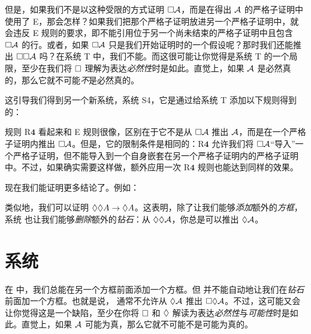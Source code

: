 但是，如果我们不是以这种受限的方式证明 $\Box\mathcal{A}$，而是在得出 $\mathcal{A}$ 的严格子证明中使用了 \ebox E，那会怎样？如果我们把那个严格子证明放进另一个严格子证明中，就会违反 \ebox E 规则的要求，即不能引用位于另一个尚未结束的严格子证明中且包含 $\Box\mathcal{A}$ 的行。或者，如果 $\Box\mathcal{A}$ 只是我们开始证明时的一个假设呢？那时我们还能推出 $\Box\Box\mathcal{A}$ 吗？在系统 T 中，我们不能。而这很可能让你觉得是系统 T 的一个局限，至少在我们将 $\Box$ 理解为表达\emph{必然性}时是如此。直觉上，如果 $\mathcal{A}$ 是必然真的，那么它就不可能\emph{不}是必然真的。

这引导我们得到另一个新系统，系统 S4，它是通过给系统 T 添加以下规则得到的：

规则 R$\mathbf{4}$ 看起来和 {\ebox}E 规则很像，区别在于它不是从 $\Box\mathcal{A}$ 推出 $\mathcal{A}$，而是在一个严格子证明内推出 $\Box\mathcal{A}$。但是，它的限制条件是相同的：R$\mathbf{4}$ 允许我们将 $\Box \mathcal{A}$“导入”一个严格子证明，但不能导入到一个自身嵌套在另一个严格子证明内的严格子证明中。不过，如果确实需要这样做，额外应用一次 R$\mathbf{4}$ 规则也能达到同样的效果。

现在我们能证明更多结论了。例如：

\begin{fitchproof}
	\open
	\AS
	\open
	\AS
	\close
	\close
\end{fitchproof}

类似地，我们可以证明 $\Diamond\Diamond A \rightarrow \Diamond A$。这表明，除了让我们能够\emph{添加}额外的\emph{方框}，系统 \mlSfour{} 也让我们能够\emph{删除}额外的\emph{钻石}：从 $\Diamond\Diamond \mathcal{A}$，你总是可以推出 $\Diamond\mathcal{A}$。

\section{系统 \mlSfive}
\label{S5}

在 \mlSfour{} 中，我们总能在另一个方框前面添加一个方框。但 \mlSfour{} 并不能自动地让我们在\emph{钻石}前面加一个方框。也就是说，\mlSfour{} 通常不允许从 $\Diamond\mathcal{A}$ 推出 $\Box\Diamond\mathcal{A}$。不过，这可能又会让你觉得这是一个缺陷，至少在你将 $\Box$ 和 $\Diamond$ 解读为表达\emph{必然性}与\emph{可能性}时是如此。直觉上，如果 $\mathcal{A}$ 可能为真，那么它就不可能不是可能为真的。

